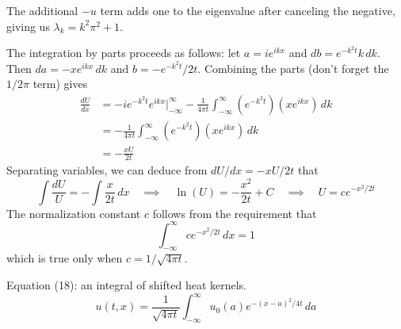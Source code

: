 \documentclass[a4paper]{article}
\begin{document}
\vspace{12pt}

The additional \( -u \) term adds one to the eigenvalue after canceling the negative, giving us \( \lambda_{k} = k^{2}\pi^{2} + 1 \).

\vspace{12pt}

The integration by parts proceeds as follows: let \( a = ie^{ikx} \) and \( db = e^{-k^{2}t}k \, dk \). Then \( da = -xe^{ikx} \, dk \) and \( b = -e^{-k^{2}t} / 2t \). Combining the parts (don't forget the \( 1 / 2 \pi \) term) gives
\begin{align*}
	\frac{d U}{d x} & = -ie^{-k^{2}t}e^{ikx} \Big|^{\infty}_{-\infty} - \frac{1}{4 \pi t}\int^{\infty}_{-\infty} \!\left( e^{-k^{2}t} \right)\!\left( xe^{ikx} \right) \, dk \\
			& = -\frac{1}{4 \pi t}\int^{\infty}_{-\infty} \!\left( e^{-k^{2}t} \right)\!\left( xe^{ikx} \right) \, dk \\
			& = -\frac{xU}{2t}
\end{align*}
Separating variables, we can deduce from \( dU / dx = -xU / 2t \) that
\[
	\int \frac{dU}{U} = -\int \frac{x}{2t} \, dx \quad \implies \quad \ln\!\left(U\right) = -\frac{x^{2}}{2t} + C \quad \implies \quad U = ce^{-x^{2} / 2t}
\]
The normalization constant \( c \) follows from the requirement that
\[
	\int^{\infty}_{-\infty} ce^{-x^{2} / 2t} \, dx = 1 
\]
which is true only when \( c = 1 / \sqrt{4 \pi t} \).

\vspace{12pt}

Equation (18): an integral of shifted heat kernels.
\[
	u \!\left( t,x \right) = \frac{1}{\sqrt{4 \pi t}} \int^{\infty}_{-\infty} u_{0}\!\left( a \right)e^{-\!\left( x - a \right)^{2} / 4t} \, da  
\]
\end{document}
